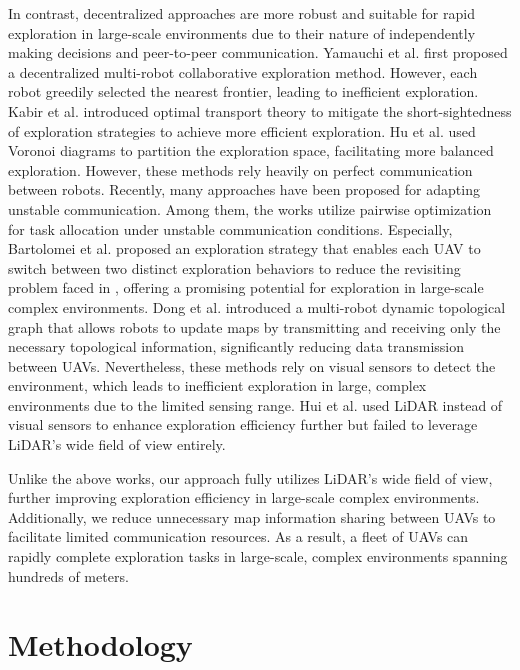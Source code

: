 \documentclass[letterpaper, 10pt, journal, twoside]{support/IEEEtran}
\begin{document}
In contrast, decentralized approaches are more robust and suitable for rapid exploration in large-scale environments due to their nature of independently making decisions and peer-to-peer communication. 
Yamauchi et al. \cite{yamauchi1999decentralized} first proposed a decentralized multi-robot collaborative exploration method. However, each robot greedily selected the nearest frontier, leading to inefficient exploration. 
Kabir et al. \cite{kabir2021efficient} introduced optimal transport theory to mitigate the short-sightedness of exploration strategies to achieve more efficient exploration. 
Hu et al. \cite{hu2020voronoi} used Voronoi diagrams to partition the exploration space, facilitating more balanced exploration. 
However, these methods rely heavily on perfect communication between robots. Recently, many approaches \cite{zhou2023racer, bartolomei2023fast, dong2024fast} have been proposed for adapting unstable communication. 
Among them, the works \cite{zhou2023racer, bartolomei2023fast} utilize pairwise optimization \cite{klodt2015equitable} for task allocation under unstable communication conditions. 
Especially, Bartolomei et al. \cite{bartolomei2023fast} proposed an exploration strategy that enables each UAV to switch between two distinct exploration behaviors to reduce the revisiting problem faced in \cite{zhou2023racer}, offering a promising potential for exploration in large-scale complex environments. 
Dong et al. \cite{dong2024fast} introduced a multi-robot dynamic topological graph that allows robots to update maps by transmitting and receiving only the necessary topological information, significantly reducing data transmission between UAVs.
Nevertheless, these methods rely on visual sensors to detect the environment, which leads to inefficient exploration in large, complex environments due to the limited sensing range. 
Hui et al. \cite{hui2023dppm} used LiDAR instead of visual sensors to enhance exploration efficiency further but failed to leverage LiDAR's wide field of view entirely.

Unlike the above works, our approach fully utilizes LiDAR’s wide field of view, further improving exploration efficiency in large-scale complex environments. Additionally, we reduce unnecessary map information sharing between UAVs to facilitate limited communication resources. As a result, a fleet of UAVs can rapidly complete exploration tasks in large-scale, complex environments spanning hundreds of meters.


\section{Methodology}
\label{sec:method}
\end{document}
